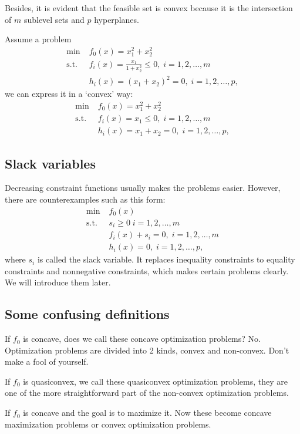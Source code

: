 \documentclass[lang=en,color=blue,mode=fancy,titlestyle=hang]{elegantbook}
\begin{document}
Besides, it is evident that the feasible set is convex because it is the intersection of
$m$ sublevel sets and $p$ hyperplanes.

Assume a problem
\begin{align*}
  \min \; &f_0(x) = x_1^2 + x_2^2 \\
  \text{s.t.} \; &f_i(x) = \frac{x_1}{1+x_2^2} \leq 0, \; i = 1, 2, \ldots, m \\
  &h_i(x) = {(x_1 + x_2)}^2 = 0, \; i = 1, 2, \ldots, p,
\end{align*}
we can express it in a `convex' way:
\begin{align*}
  \min \; &f_0(x) = x_1^2 + x_2^2 \\
  \text{s.t.} \; &f_i(x) = x_1 \leq 0, \; i = 1, 2, \ldots, m \\
  &h_i(x) = x_1 + x_2 = 0, \; i = 1, 2, \ldots, p,
\end{align*}

\subsection{Slack variables}
Decreasing constraint functions usually makes the problems easier. However, there are
counterexamples such as this form:
\begin{align*}
  \min \; &f_0(x) \\
  \text{s.t.} \; &s_i \geq 0 \; i = 1, 2, \ldots, m \\
  &f_i(x) + s_i = 0, \; i = 1, 2, \ldots, m \\
  &h_i(x) = 0, \; i = 1, 2, \ldots, p,
\end{align*}
where $s_i$ is called the slack variable. It replaces inequality constraints to equality
constraints and nonnegative constraints, which makes certain problems clearly. We will
introduce them later.

\subsection{Some confusing definitions}
If $f_0$ is concave, does we call these concave optimization problems? No. Optimization
problems are divided into 2 kinds, convex and non-convex. Don't make a fool of yourself.

If $f_0$ is quasiconvex, we call these quasiconvex optimization problems, they are
one of the more straightforward part of the non-convex optimization problems.

If $f_0$ is concave and the goal is to maximize it. Now these become concave maximization
problems or convex optimization problems.
\end{document}
